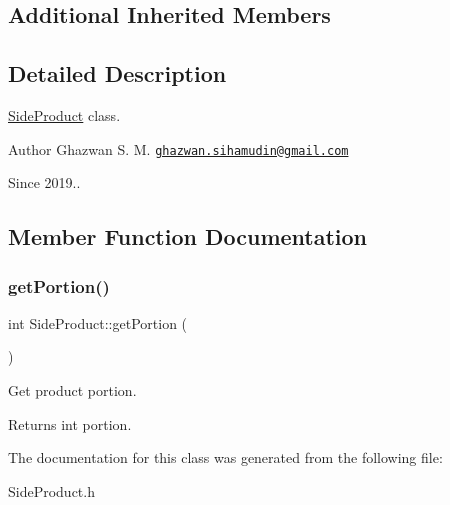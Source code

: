 \subsection*{Additional Inherited Members}


\subsection{Detailed Description}
\hyperlink{classSideProduct}{Side\+Product} class.

\begin{DoxyAuthor}{Author}
Ghazwan S. M. \href{mailto:ghazwan.sihamudin@gmail.com}{\tt ghazwan.\+sihamudin@gmail.\+com} 
\end{DoxyAuthor}
\begin{DoxySince}{Since}
2019.. 
\end{DoxySince}


\subsection{Member Function Documentation}
\mbox{\label{classSideProduct_a8265dbcfcde3880817bfb8d82e563700}} 
\subsubsection{\texorpdfstring{get\+Portion()}{getPortion()}}
{\footnotesize\ttfamily int Side\+Product\+::get\+Portion (\begin{DoxyParamCaption}{ }\end{DoxyParamCaption})}

Get product portion. \begin{DoxyReturn}{Returns}
int portion. 
\end{DoxyReturn}


The documentation for this class was generated from the following file\+:\begin{DoxyCompactItemize}
\item 
Side\+Product.\+h\end{DoxyCompactItemize}

